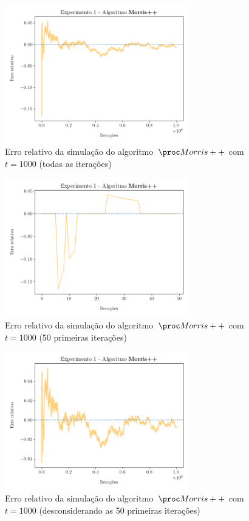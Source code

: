 \newpage
\begin{figure}[h]
  \centering
  \includegraphics[height=6cm, width=\textwidth]{figuras/morris_plus_erro_full.png}
	\caption{Erro relativo da simulação do algoritmo~$\Morrispp$ com $t = 1000$ (todas as iterações)}
  \label{fig:morris:plus:erro:full}
\end{figure}

\begin{figure}[h]
  \centering
  \includegraphics[height=6cm, width=\textwidth]{figuras/morris_plus_erro_first.png}
	\caption{Erro relativo da simulação do algoritmo~$\Morrispp$ com $t = 1000$ (50 primeiras iterações)}
  \label{fig:morris:plus:erro:first}
\end{figure}

\newpage
\begin{figure}[h]
  \centering
  \includegraphics[height=6cm, width=\textwidth]{figuras/morris_plus_erro_sem_first.png}
	\caption{Erro relativo da simulação do algoritmo~$\Morrispp$ com $t = 1000$ (desconsiderando as 50 primeiras iterações)}
  \label{fig:morris:plus:erro:sem:first}
\end{figure}

